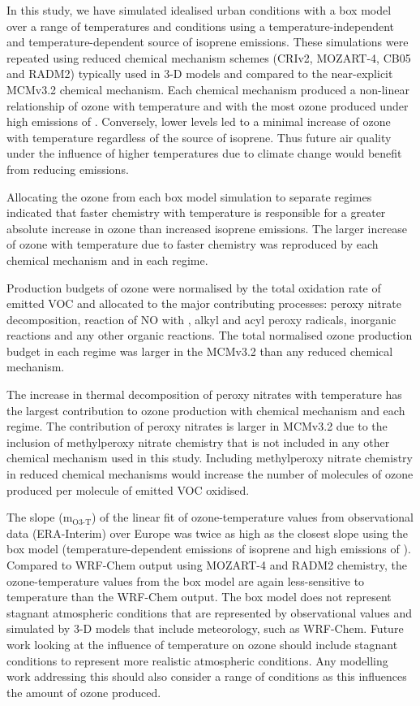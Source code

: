 In this study, we have simulated idealised urban conditions with a box model over a range of temperatures and  conditions using a temperature-independent and temperature-dependent source of isoprene emissions.
These simulations were repeated using reduced chemical mechanism schemes (CRIv2, MOZART-4, CB05 and RADM2) typically used in 3-D models and compared to the near-explicit MCMv3.2 chemical mechanism.
Each chemical mechanism produced a non-linear relationship of ozone with temperature and  with the most ozone produced under high emissions of .
Conversely, lower  levels led to a minimal increase of ozone with temperature regardless of the source of isoprene.
Thus future air quality under the influence of higher temperatures due to climate change would benefit from reducing  emissions.

Allocating the ozone from each box model simulation to separate  regimes indicated that faster chemistry with temperature is responsible for a greater absolute increase in ozone than increased isoprene emissions.
The larger increase of ozone with temperature due to faster chemistry was reproduced by each chemical mechanism and in each  regime.

Production budgets of ozone were normalised by the total oxidation rate of emitted VOC and allocated to the major contributing processes: peroxy nitrate decomposition, reaction of NO with , alkyl and acyl peroxy radicals, inorganic reactions and any other organic reactions.
The total normalised ozone production budget in each  regime was larger in the MCMv3.2 than any reduced chemical mechanism.

The increase in thermal decomposition of peroxy nitrates with temperature has the largest contribution to ozone production with chemical mechanism and each  regime.
The contribution of peroxy nitrates is larger in MCMv3.2 due to the inclusion of methylperoxy nitrate chemistry that is not included in any other chemical mechanism used in this study.
Including methylperoxy nitrate chemistry in reduced chemical mechanisms would increase the number of molecules of ozone produced per molecule of emitted VOC oxidised.

The slope (m$_{\text{O3-T}}$) of the linear fit of ozone-temperature values from observational data (ERA-Interim) over Europe was twice as high as the closest slope using the box model (temperature-dependent emissions of isoprene and high emissions of ).
Compared to WRF-Chem output using MOZART-4 and RADM2 chemistry, the ozone-temperature values from the box model are again less-sensitive to temperature than the WRF-Chem output.
The box model does not represent stagnant atmospheric conditions that are represented by observational values and simulated by 3-D models that include meteorology, such as WRF-Chem.
Future work looking at the influence of temperature on ozone should include stagnant conditions to represent more realistic atmospheric conditions.
Any modelling work addressing this should also consider a range of  conditions as this influences the amount of ozone produced.
